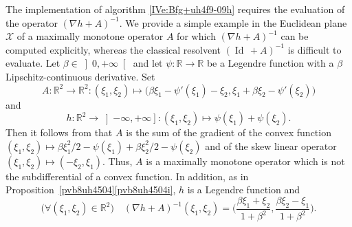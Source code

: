 \documentclass[a4paper,11pt,fleqn]{article}
\newcommand{\RX}{\ensuremath{\left]-\infty,+\infty\right]}}
\newcommand{\XX}{\ensuremath{{\mathcal X}}}
\newcommand{\Id}{\ensuremath{\operatorname{Id}}\,}
\newcommand{\RR}{\ensuremath{\mathbb{R}}}
\newcommand{\RPP}{\ensuremath{\left]0,+\infty\right[}}
\theoremstyle{plain}{\theorembodyfont{\rmfamily}%
\newtheorem{conjecture}[theorem]{Conjecture}}
\theoremstyle{plain}{\theorembodyfont{\rmfamily}%
\newtheorem{example}[theorem]{Example}}
\theoremstyle{plain}{\theorembodyfont{\rmfamily}%
\newtheorem{remark}[theorem]{Remark}}
\theoremstyle{plain}{\theorembodyfont{\rmfamily}%
\newtheorem{algorithm}[theorem]{Algorithm}}
\theoremstyle{plain}{\theorembodyfont{\rmfamily}%
\newtheorem{condition}[theorem]{Condition}}
\theoremstyle{plain}{\theorembodyfont{\rmfamily}%
\newtheorem{definition}[theorem]{Definition}}
\theoremstyle{plain}{\theorembodyfont{\rmfamily}
\newtheorem{problem}[theorem]{Problem}}
\theoremstyle{plain}{\theorembodyfont{\rmfamily}
\newtheorem{notation}[theorem]{Notation}}
\numberwithin{equation}{section}
\begin{document}
\begin{remark}
The implementation of algorithm \eqref{IVe:Bfg+uh4f9-09h}
requires the evaluation of the operator $(\nabla h+A)^{-1}$.
We provide a simple example in the Euclidean plane $\XX$ of a
maximally monotone operator $A$ for which 
$(\nabla h+A)^{-1}$ can be computed explicitly, whereas
the classical resolvent $(\Id+A)^{-1}$ is difficult to evaluate.
Let $\beta\in\RPP$ and let $\psi\colon\RR\to\RR$ be a Legendre 
function with a $\beta$ Lipschitz-continuous derivative.
Set
\begin{equation}
A\colon\RR^2\to\RR^2\colon (\xi_1,\xi_2)\mapsto
\big(\beta\xi_1-\psi'(\xi_1)-\xi_2,
\xi_1+\beta\xi_2-\psi'(\xi_2)\big)
\end{equation}
and 
\begin{equation}
h\colon\RR^2\to\RX\colon (\xi_1,\xi_2)\mapsto
\psi(\xi_1)+\psi(\xi_2).
\end{equation}
Then it follows from \cite[Theorem~18.15]{Livre1} that $A$ is the
sum of the gradient of the convex function 
$(\xi_1,\xi_2)\mapsto\beta\xi_1^2/2-\psi(\xi_1)+
\beta\xi_2^2/2-\psi(\xi_2)$ 
and of the skew linear operator $(\xi_1,\xi_2)\mapsto(-\xi_2,\xi_1)$.
Thus, $A$ is a maximally monotone operator 
\cite[Corollary~24.4]{Livre1} which is not the
subdifferential of a convex function. In addition, as in 
Proposition~\ref{pvb8uh4504}\ref{pvb8uh4504i},
$h$ is a Legendre function and
\begin{equation}
\big(\forall (\xi_1,\xi_2)\in\RR^2\big)\quad 
(\nabla h+A)^{-1}(\xi_1,\xi_2)
=\Bigg(\dfrac{\beta\xi_1+\xi_2}{1+\beta^2},
\dfrac{\beta\xi_2-\xi_1}{1+\beta^2}\Bigg).
\end{equation}
\end{remark}
\end{document}
